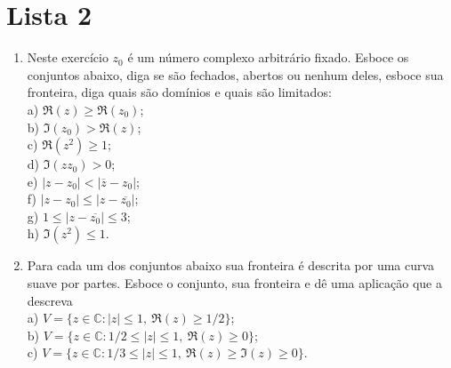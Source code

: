 \chapter*{Lista 2}



\begin{enumerate}[leftmargin=*]
	\item Neste exercício $z_0$ é um número complexo arbitrário fixado. 
	Esboce os conjuntos abaixo, diga se são fechados, abertos
	ou nenhum deles, esboce sua fronteira, diga quais são domínios e quais são limitados:
	\\
	a) $\Re(z)\geq \Re(z_0)$;\\
	b) $\Im(z_0)> \Re(z)$;\\
	c) $\Re(z^2)\geq 1$;\\
	d) $\Im(zz_0)>0$;\\
	e) $|z-z_0|<|\overline{z}-z_0|$;\\
	f) $|z-z_0|\leq |z-\overline{z_0}|$;\\
	g) $1\leq |z-\overline{z_0}|\leq 3$;\\
	h) $\Im(z^2)\leq 1$.
	\item Para cada um dos conjuntos abaixo sua fronteira é descrita 
	por uma curva suave por partes. Esboce o conjunto, sua fronteira e dê uma aplicação que a descreva\\
	a) $V=\{z\in\mathbb{C}: |z|\leq 1,\ \Re(z)\geq 1/2\}$;\\
	b) $V=\{z\in\mathbb{C}: 1/2\leq |z|\leq 1, \ \Re(z)\geq 0\}$;\\
	c) $V=\{z\in\mathbb{C}: 1/3\leq |z|\leq 1,\  \Re(z)\geq \Im(z)\geq 0\}$.


\end{enumerate}
